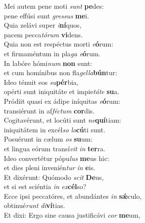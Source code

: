\evenverse Mei autem pene moti \textit{sunt} \textbf{pe}des:~\*\\
\evenverse pene effúsi sunt \textit{gres}\textit{sus} \textbf{me}i.\\
\oddverse Quia zelávi super \textit{i}\textbf{ní}quos,~\*\\
\oddverse pacem pecca\textit{tó}\textit{rum} \textbf{vi}dens.\\
\evenverse Quia non est respéctus morti \textit{e}\textbf{ó}rum:~\*\\
\evenverse et firmaméntum in pla\textit{ga} \textit{e}\textbf{ó}rum.\\
\oddverse In labóre hómi\textit{num} \textbf{non} sunt:~\*\\
\oddverse et cum homínibus non fla\textit{gel}\textit{la}\textbf{bún}tur:\\
\evenverse Ideo ténuit eos \textit{su}\textbf{pér}bia,~\*\\
\evenverse opérti sunt iniquitáte et impie\textit{tá}\textit{te} \textbf{su}a.\\
\oddverse Pródiit quasi ex ádipe iníquitas \textit{e}\textbf{ó}rum:~\*\\
\oddverse transiérunt in af\textit{fé}\textit{ctum} \textbf{cor}dis.\\
\evenverse Cogitavérunt, et locúti sunt \textit{ne}\textbf{quí}tiam:~\*\\
\evenverse iniquitátem in excél\textit{so} \textit{lo}\textbf{cú}ti sunt.\\
\oddverse Posuérunt in cælum \textit{os} \textbf{su}um:~\*\\
\oddverse et lingua eórum transí\textit{vit} \textit{in} \textbf{ter}ra.\\
\evenverse Ideo convertétur pópu\textit{lus} \textbf{me}us hic:~\*\\
\evenverse et dies pleni invenién\textit{tur} \textit{in} \textbf{e}is.\\
\oddverse Et dixérunt: Quómodo \textit{scit} \textbf{De}us,~\*\\
\oddverse et si est sciéntia \textit{in} \textit{ex}\textbf{cél}so?\\
\evenverse Ecce ipsi peccatóres, et abundántes \textit{in} \textbf{sǽ}culo,~\*\\
\evenverse obtinué\textit{runt} \textit{di}\textbf{ví}tias.\\
\oddverse Et dixi: Ergo sine causa justificávi \textit{cor} \textbf{me}um,~\*\\
